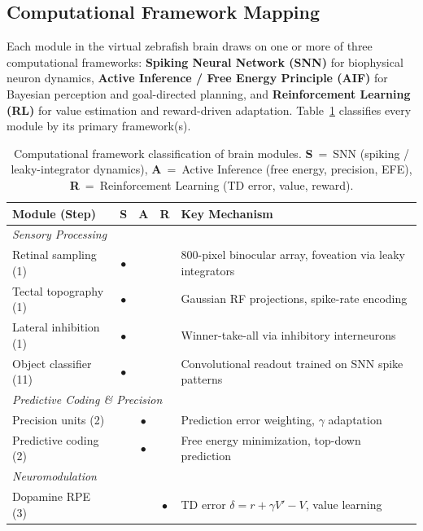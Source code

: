 \documentclass[11pt,a4paper]{article}
\begin{document}
\subsection{Computational Framework Mapping}\label{sec:framework_map}

Each module in the virtual zebrafish brain draws on one or more of three
computational frameworks:
\textbf{Spiking Neural Network (SNN)} for biophysical neuron dynamics,
\textbf{Active Inference / Free Energy Principle (AIF)} for Bayesian
perception and goal-directed planning, and
\textbf{Reinforcement Learning (RL)} for value estimation and reward-driven
adaptation.
Table~\ref{tab:framework} classifies every module by its primary framework(s).

\begin{table}[H]
\centering
\caption{Computational framework classification of brain modules.
  \textbf{S}~=~SNN (spiking / leaky-integrator dynamics),
  \textbf{A}~=~Active Inference (free energy, precision, EFE),
  \textbf{R}~=~Reinforcement Learning (TD error, value, reward).}
\label{tab:framework}
\small
\begin{tabular}{lcccp{5.8cm}}
\toprule
Module (Step) & S & A & R & Key Mechanism \\
\midrule
\multicolumn{5}{l}{\textit{Sensory Processing}} \\
Retinal sampling (1)           & $\bullet$ &           &           & 800-pixel binocular array, foveation via leaky integrators \\
Tectal topography (1)          & $\bullet$ &           &           & Gaussian RF projections, spike-rate encoding \\
Lateral inhibition (1)         & $\bullet$ &           &           & Winner-take-all via inhibitory interneurons \\
Object classifier (11)         & $\bullet$ &           &           & Convolutional readout trained on SNN spike patterns \\
\midrule
\multicolumn{5}{l}{\textit{Predictive Coding \& Precision}} \\
Precision units (2)            &           & $\bullet$ &           & Prediction error weighting, $\gamma$ adaptation \\
Predictive coding (2)          &           & $\bullet$ &           & Free energy minimization, top-down prediction \\
\midrule
\multicolumn{5}{l}{\textit{Neuromodulation}} \\
Dopamine RPE (3)               &           &           & $\bullet$ & TD error $\delta = r + \gamma V' - V$, value learning \\

\end{tabular}
\end{table}
\end{document}
